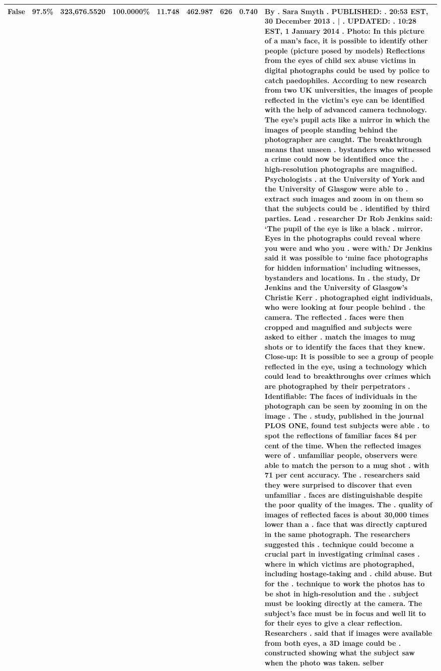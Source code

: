 \begin{table}[H]
\begin{tabular}{lllrlllll}
\cline{1-9}
False & 97.5\% & 323,676.5520 & \bfseries \color{red} 100.0000\% & 11.748 & 462.987 & 626 & 0.740 & By . Sara Smyth . PUBLISHED: . 20:53 EST, 30 December 2013 . | . UPDATED: . 10:28 EST, 1 January 2014 . Photo: In this picture of a man's face, it is possible to identify other people (picture posed by models) Reflections from the eyes of child sex abuse victims in digital photographs could be used by police to catch paedophiles. According to new research from two UK universities, the images of people reflected in the victim's eye can be identified with the help of advanced camera technology. The eye's pupil acts like a mirror in which the images of people standing behind the photographer are caught. The breakthrough means that unseen . bystanders who witnessed a crime could now be identified once the . high-resolution photographs are magnified. Psychologists . at the University of York and the University of Glasgow were able to . extract such images and zoom in on them so that the subjects could be . identified by third parties. Lead . researcher Dr Rob Jenkins said: ‘The pupil of the eye is like a black . mirror. Eyes in the photographs could reveal where you were and who you . were with.' Dr Jenkins said it was possible to ‘mine face photographs for hidden information' including witnesses, bystanders and locations. In . the study, Dr Jenkins and the University of Glasgow's Christie Kerr . photographed eight individuals, who were looking at four people behind . the camera. The reflected . faces were then cropped and magnified and subjects were asked to either . match the images to mug shots or to identify the faces that they knew. Close-up: It is possible to see a group of people reflected in the eye, using a technology which could lead to breakthroughs over crimes which are photographed by their perpetrators . Identifiable: The faces of individuals in the photograph can be seen by zooming in on the image . The . study, published in the journal PLOS ONE, found test subjects were able . to spot the reflections of familiar faces 84 per cent of the time. When the reflected images were of . unfamiliar people, observers were able to match the person to a mug shot . with 71 per cent accuracy. The . researchers said they were surprised to discover that even unfamiliar . faces are distinguishable despite the poor quality of the images. The . quality of images of reflected faces is about 30,000 times lower than a . face that was directly captured in the same photograph. The researchers suggested this . technique could become a crucial part in investigating criminal cases . where in which victims are photographed, including hostage-taking and . child abuse. But for the . technique to work the photos has to be shot in high-resolution and the . subject must be looking directly at the camera. The subject's face must be in focus and well lit to for their eyes to give a clear reflection. Researchers . said that if images were available from both eyes, a 3D image could be . constructed showing what the subject saw when the photo was taken. selber \\
\cline{1-9}
\bottomrule
\end{tabular}
\end{table}
